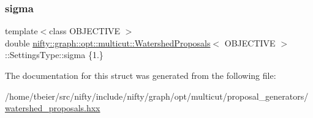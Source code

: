 \mbox{\label{structnifty_1_1graph_1_1opt_1_1multicut_1_1WatershedProposals_1_1SettingsType_af51562f48c898c74ae4f15b2d3c239ec}} 
\subsubsection{\texorpdfstring{sigma}{sigma}}
{\footnotesize\ttfamily template$<$class O\+B\+J\+E\+C\+T\+I\+VE $>$ \\
double \hyperlink{classnifty_1_1graph_1_1opt_1_1multicut_1_1WatershedProposals}{nifty\+::graph\+::opt\+::multicut\+::\+Watershed\+Proposals}$<$ O\+B\+J\+E\+C\+T\+I\+VE $>$\+::Settings\+Type\+::sigma \{1.\}}



The documentation for this struct was generated from the following file\+:\begin{DoxyCompactItemize}
\item 
/home/tbeier/src/nifty/include/nifty/graph/opt/multicut/proposal\+\_\+generators/\hyperlink{watershed__proposals_8hxx}{watershed\+\_\+proposals.\+hxx}\end{DoxyCompactItemize}
